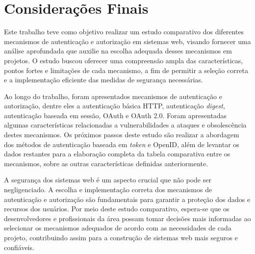 \section{Considerações Finais}

Este trabalho teve como objetivo realizar um estudo comparativo dos diferentes mecanismos de 
autenticação e autorização em sistemas web, visando fornecer uma análise aprofundada que auxilie na 
escolha adequada desses mecanismos em projetos. O estudo buscou oferecer uma compreensão ampla das 
características, pontos fortes e limitações de cada mecanismo, a fim de permitir a seleção correta 
e a implementação eficiente das medidas de segurança necessárias.

Ao longo do trabalho, foram apresentados mecanismos de autenticação e autorização, dentre eles a 
autenticação básica HTTP, autenticação \emph{digest}, autenticação baseada em sessão, OAuth e OAuth 2.0.
Foram apresentadas algumas características relacionadas a vulnerabilidades a ataques e 
obsolescência destes mecanismos. Os próximos passos deste estudo são realizar a abordagem dos 
métodos de autenticação baseada em \emph{token} e OpenID, além de levantar os dados restantes para 
a elaboração completa da tabela comparativa entre os mecanismos, sobre as outras características 
definidas anteriormente.

A segurança dos sistemas web é um aspecto crucial que não pode ser negligenciado. A escolha e 
implementação correta dos mecanismos de autenticação e autorização são fundamentais para garantir 
a proteção dos dados e recursos dos usuários. Por meio deste estudo comparativo, espera-se que os 
desenvolvedores e profissionais da área possam tomar decisões mais informadas ao selecionar os 
mecanismos adequados de acordo com as necessidades de cada projeto, contribuindo assim para a 
construção de sistemas web mais seguros e confiáveis.
